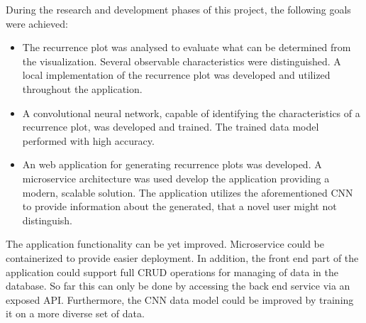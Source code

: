 During the research and development phases of this project, the following goals were achieved:
\begin{itemize}
    \item The recurrence plot was analysed to evaluate what can be determined from the visualization. Several observable characteristics were distinguished. A local implementation of the recurrence plot was developed and utilized throughout the application.
    \item A convolutional neural network, capable of identifying the characteristics of a recurrence plot, was developed and trained. The trained data model performed with high accuracy.
    \item An web application for generating recurrence plots was developed. A microservice architecture was used develop the application providing a modern, scalable solution. The application utilizes the aforementioned CNN to provide information about the generated, that a novel user might not distinguish.
\end{itemize}

The application functionality can be yet improved. Microservice could be containerized to provide easier deployment. 
In addition, the front end part of the application could support full CRUD operations for managing of data in the database. 
So far this can only be done by accessing the back end service via an exposed API.
Furthermore, the CNN data model could be improved by training it on a more diverse set of data.